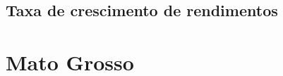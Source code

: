 \documentclass[10pt]{beamer}
\begin{document}
\begin{frame}
\textit{\hyperlink{indice_principal_amz_jovem}{}}

\end{frame}

\begin{frame}
\textit{\hyperlink{indice_principal_amz_jovem}{}}

\end{frame}

\begin{frame}
\textit{\hyperlink{indice_principal_amz_jovem}{}}

\end{frame}

\subsection{Taxa de crescimento de rendimentos}

\begin{frame}
\textit{\hyperlink{indice_principal_amz_jovem}{}}

\end{frame}

\begin{frame}
\textit{\hyperlink{indice_principal_amz_jovem}{}}

\end{frame}

\begin{frame}
\textit{\hyperlink{indice_principal_amz_jovem}{}}

\end{frame}

\section{Mato Grosso}
\end{document}
